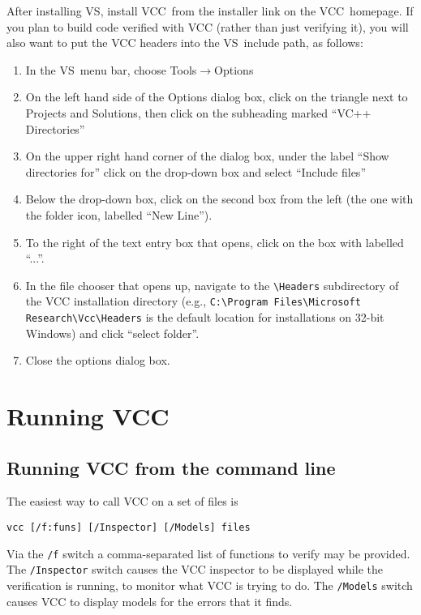 After installing VS, install VCC\ from the installer link on the
VCC\ homepage. If you plan to build code verified with VCC (rather
than just verifying it), you will also want to put the VCC headers
into the VS\ include path, as follows:
\begin{enumerate}
\item In the VS\ menu bar, choose Tools$\rightarrow$Options
\item On the left hand side of the Options dialog box, click on the
  triangle next to Projects and Solutions, then click on the
  subheading marked ``VC++ Directories''
\item On the upper right hand corner of the dialog box, under the
  label ``Show directories for'' click on the drop-down box and select
  ``Include files''
\item Below the drop-down box, click on the second box from the left
  (the one with the folder icon, labelled ``New Line'').
\item To the right of the text entry box that opens, click on the box
  with labelled ``...''.
\item In the file chooser that opens up, navigate to the \verb!\Headers!
  subdirectory of the VCC installation directory (e.g., \verb!C:\Program Files\Microsoft Research\Vcc\Headers! is the default location for
  installations on 32-bit Windows) and click ``select folder''.
\item Close the options dialog box.
\end{enumerate}

\section{Running VCC}
\subsection{Running VCC from the command line}
The easiest way to call VCC on a set of files is
\begin{verbatim}
vcc [/f:funs] [/Inspector] [/Models] files
\end{verbatim}
Via the \verb!/f! switch a comma-separated list of functions to
verify may be provided. The \verb!/Inspector! switch causes the VCC inspector to be
displayed while the verification is running, to monitor what VCC is
trying to do. The \verb!/Models! switch causes VCC to display models for
the errors that it finds.
 
